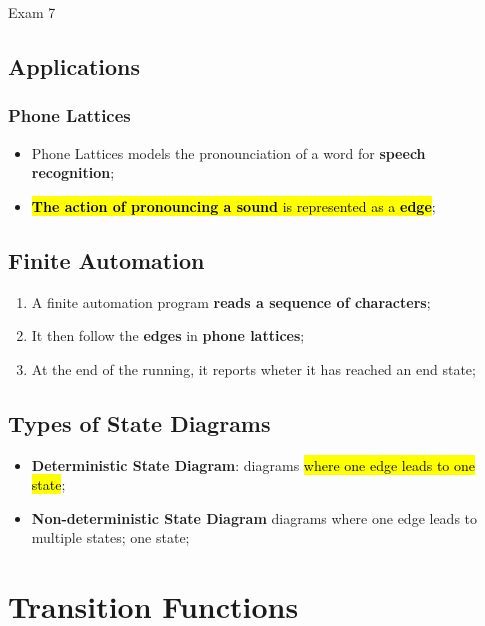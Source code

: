 \documentclass{note}
\begin{document}
\begin{note}{Exam 7}
    \subsection{Applications}
    
        \subsubsection{Phone Lattices}
        
        \begin{itemize}
            \item Phone Lattices models the pronounciation of a word for \textbf{speech recognition};
            \item \hl{\textbf{The action of pronouncing a sound} is represented as a \textbf{edge}};
        \end{itemize}
        
        \subsection{Finite Automation}
        
        \begin{enumerate}
            \item A finite automation program \textbf{reads a sequence of characters};
            \item It then follow the \textbf{edges} in \textbf{phone lattices};
            \item At the end of the running, it reports wheter it has reached an end state;
        \end{enumerate}
        
    \subsection{Types of State Diagrams}
    
    \begin{itemize}
        \item \textbf{Deterministic State Diagram}: diagrams \hl{where one edge leads to one state};
        \item \textbf{Non-deterministic State Diagram} diagrams where one edge leads to multiple states; 
        one state;
    \end{itemize}
        
\section{Transition Functions}


\end{note}
\end{document}
